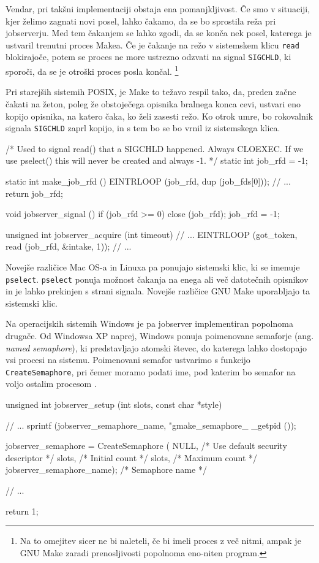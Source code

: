 \documentclass[notitlepage]{report}
\begin{document}
Vendar, pri takšni implementaciji obstaja ena pomanjkljivost. Če smo v
situaciji, kjer želimo zagnati novi posel, lahko čakamo, da se bo
sprostila reža pri jobserverju. Med tem čakanjem se lahko zgodi, da se
konča nek posel, katerega je ustvaril trenutni proces Makea. Če je
čakanje na režo v sistemskem klicu \verb|read| blokirajoče, potem se
proces ne more ustrezno odzvati na signal \verb|SIGCHLD|, ki sporoči,
da se je otroški proces posla končal. \footnote{Na to omejitev sicer
  ne bi naleteli, če bi imeli proces z več nitmi, ampak je GNU Make
  zaradi prenosljivosti popolnoma eno-niten program.}

Pri starejših sistemih POSIX, je Make to težavo respil tako, da,
preden začne čakati na žeton, poleg že obstoječega opisnika bralnega
konca cevi, ustvari eno kopijo opisnika, na katero čaka, ko želi
zasesti režo. Ko otrok umre, bo rokovalnik signala \verb|SIGCHLD|
zaprl kopijo, in s tem bo se bo vrnil iz sistemskega klica.

\begin{pygmented}[lang=c]
/* Used to signal read() that a SIGCHLD happened.  Always CLOEXEC.
   If we use pselect() this will never be created and always -1.
 */
static int job_rfd = -1;

static int
make_job_rfd ()
{
  EINTRLOOP (job_rfd, dup (job_fds[0]));
  // ...
  return job_rfd;
}

void
jobserver_signal ()
{
  if (job_rfd >= 0)
    {
      close (job_rfd);
      job_rfd = -1;
    }
}

unsigned int
jobserver_acquire (int timeout)
{
  // ...
  EINTRLOOP (got_token, read (job_rfd, &intake, 1));
  // ...
}
\end{pygmented}

Novejše različice Mac OS-a in Linuxa pa ponujajo sistemski klic, ki se
imenuje \verb|pselect|. \verb|pselect| ponuja možnost čakanja na enega
ali več datotečnih opisnikov in je lahko prekinjen s strani
signala. Novejše različice GNU Make uporabljajo ta sistemski klic.

Na operacijskih sistemih Windows je pa jobserver implementiran
popolnoma drugače. Od Windowsa XP naprej, Windows ponuja poimenovane
semaforje (ang. \textit{named semaphore}), ki predstavljajo atomski
števec, do katerega lahko dostopajo vsi procesi na
sistemu. Poimenovani semafor ustvarimo s funkcijo
\verb|CreateSemaphore|, pri čemer moramo podati ime, pod katerim bo
semafor na voljo ostalim procesom \cite{ms-semaphore}.

\begin{pygmented}[lang=c]
unsigned int
jobserver_setup (int slots, const char *style)
{
  // ...
  sprintf (jobserver_semaphore_name, "gmake_semaphore_%
           _getpid ());

  jobserver_semaphore = CreateSemaphore (
      NULL,          /* Use default security descriptor */
      slots,                          /* Initial count */
      slots,                          /* Maximum count */
      jobserver_semaphore_name);      /* Semaphore name */
      
   // ...

   return 1;   
}      
\end{pygmented}
\end{document}
